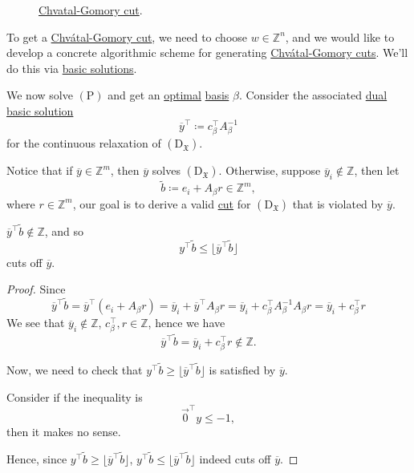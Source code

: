 \begin{figure}[H]
	\centering
	\begin{center}
	\end{center}
	\caption{\hyperref[def:Chvatal-Gomory-cut]{Chvatal-Gomory cut}.}
	\label{fig:Chvatal-Gomory-cut}
\end{figure}

\begin{remark}
	To get a \hyperref[def:Chvatal-Gomory-cut]{Chvátal-Gomory cut}, we need to choose \(w\in \mathbb{Z} ^n\), and we would like to develop a concrete algorithmic scheme for generating \hyperref[def:Chvatal-Gomory-cut]{Chvátal-Gomory cuts}. We'll do this via \hyperref[def:basic-solution]{basic solutions}.
\end{remark}

We now solve \((\mathrm{P})\) and get an \hyperref[def:optimal-solution]{optimal} \hyperref[def:basis]{basis} \(\beta\). Consider the associated \hyperref[def:dual-basic-solution]{dual basic solution}
\[
	\overline{y}^{\top}\coloneqq c_{\beta}^{\top}A^{-1}_{\beta}
\]
for the continuous relaxation of \((\mathrm{D}_{\mathfrak{X}})\).

Notice that if \(\overline{y}\in\mathbb{Z}^m\), then \(\overline{y}\) solves \((\mathrm{D}_{\mathfrak{X}})\). Otherwise, suppose \(\overline{y}_{i}\notin \mathbb{Z}\), then let
\[
	\widetilde{b}\coloneqq e_{i} + A_{\beta}r\in\mathbb{Z}^m,
\]
where \(r\in\mathbb{Z}^m\), our goal is to derive a valid \hyperref[def:Chvatal-Gomory-cut]{cut} for \((\mathrm{D}_{\mathfrak{X}})\) that is violated by \(\overline{y} \).

\begin{theorem}\label{thm:lec24-1}
	\(\overline{y}^{\top}\widetilde{b}\notin \mathbb{Z}\), and so
	\[
		y^{\top}\widetilde{b}\leq \lfloor \overline{y}^{\top}\widetilde{b} \rfloor
	\]
	cuts off \(\overline{y}\).
\end{theorem}
\begin{proof}
	Since
	\[
		\overline{y}^{\top}\widetilde{b} = \overline{y}^{\top}(e_{i}+A_{\beta}r) = \overline{y}_{i} + \overline{y}^{\top}A_{\beta}r = \overline{y}_{i} +c_{\beta}^{\top}A^{-1}_{\beta}A_{\beta}r = \overline{y}_{i} +c^{\top}_{\beta}r
	\]
	We see that \(\overline{y}_{i}\notin\mathbb{Z}\), \(c_{\beta}^{\top}, r\in \mathbb{Z}\), hence we have
	\[
		\overline{y}^{\top}\widetilde{b} = \overline{y}_{i}+c^{\top}_{\beta}r\notin \mathbb{Z}.
	\]

	Now, we need to check that \(y^{\top}\widetilde{b}\geq \lfloor \overline{y}^{\top}\widetilde{b} \rfloor\) is satisfied by \(\overline{y}\).

	\begin{intuition}
		Consider if the inequality is
		\[
			\vec{0}^{\top}y\leq -1,
		\]
		then it makes no sense.
	\end{intuition}
	Hence, since \(y^{\top}\widetilde{b}\geq \lfloor \overline{y}^{\top}\widetilde{b} \rfloor\), \(y^{\top}\widetilde{b}\leq \lfloor \overline{y}^{\top}\widetilde{b} \rfloor\)
	indeed cuts off \(\overline{y} \).
\end{proof}

